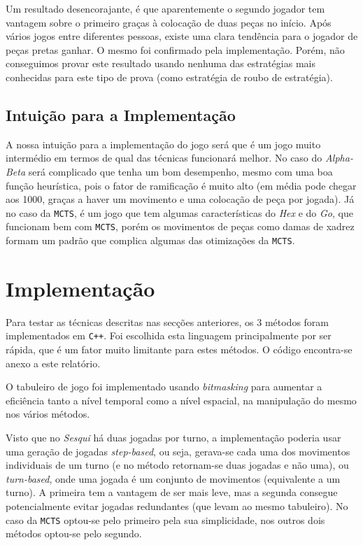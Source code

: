 \documentclass[12pt,a4paper,oneside]{article}
\begin{document}
Um resultado desencorajante, é que aparentemente o segundo jogador tem
vantagem sobre o primeiro graças à colocação de duas peças no
início. Após vários jogos entre diferentes pessoas, existe uma clara
tendência para o jogador de peças pretas ganhar. O mesmo foi
confirmado pela implementação. Porém, não conseguimos provar este
resultado usando nenhuma das estratégias mais conhecidas para este
tipo de prova (como estratégia de roubo de estratégia).

\subsection{Intuição para a Implementação}

A nossa intuição para a implementação do jogo será que é um jogo muito
intermédio em termos de qual das técnicas funcionará melhor. No caso
do \textit{Alpha-Beta} será complicado que tenha um bom desempenho,
mesmo com uma boa função heurística, pois o fator de ramificação é
muito alto (em média pode chegar aos 1000, graças a haver um movimento
e uma colocação de peça por jogada). Já no caso da \texttt{MCTS}, é um
jogo que tem algumas características do \textit{Hex} e do \textit{Go},
que funcionam bem com \texttt{MCTS}, porém os movimentos de peças como
damas de xadrez formam um padrão que complica algumas das otimizações
da \texttt{MCTS}.


\section{Implementação}
\label{sec:imp}

Para testar as técnicas descritas nas secções anteriores, os 3 métodos
foram implementados em \texttt{C++}. Foi escolhida esta linguagem
principalmente por ser rápida, que é um fator muito limitante para
estes métodos. O código encontra-se anexo a este relatório.

O tabuleiro de jogo foi implementado usando \textit{bitmasking} para
aumentar a eficiência tanto a nível temporal como a nível espacial, na
manipulação do mesmo nos vários métodos.

Visto que no \textit{Sesqui} há duas jogadas por turno, a
implementação poderia usar uma geração de jogadas \textit{step-based},
ou seja, gerava-se cada uma dos movimentos individuais de um turno (e
no método retornam-se duas jogadas e não uma), ou \textit{turn-based},
onde uma jogada é um conjunto de movimentos (equivalente a um
turno). A primeira tem a vantagem de ser mais leve, mas a segunda
consegue potencialmente evitar jogadas redundantes (que levam ao mesmo
tabuleiro). No caso da \texttt{MCTS} optou-se pelo primeiro pela sua
simplicidade, nos outros dois métodos optou-se pelo segundo.
\end{document}
